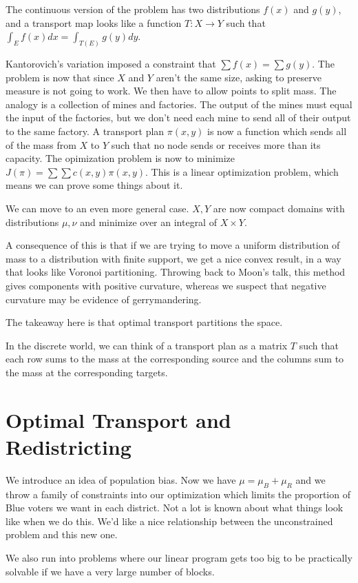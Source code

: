 The continuous version of the problem has two distributions $f(x)$ and $g(y)$, and a transport map looks like a function $T:X\rightarrow Y$ such that $\int_{E}f(x)dx  = \int_{T(E)} g(y)dy$.  

Kantorovich's variation imposed a constraint that $\sum f(x) = \sum g(y)$.  The problem is now that since $X$ and $Y$ aren't the same size, asking to preserve measure is not going to work.  We then have to allow points to split mass.  The analogy is a collection of mines and factories.  The output of the mines must equal the input of the factories, but we don't need each mine to send all of their output to the same factory.  A transport plan $\pi(x,y)$ is now a function which sends all of the mass from $X$ to $Y$ such that no node sends or receives more than its capacity.  The opimization problem is now to minimize $J(\pi) = \sum\sum c(x,y)\pi(x,y)$.  This is a linear optimization problem, which means we can prove some things about it.

We can move to an even more general case.  $X,Y$ are now compact domains with distributions $\mu,\nu$ and minimize over an integral of $X\times Y$.  


A consequence of this is that if we are trying to move a uniform distribution of mass to a distribution with finite support, we get a nice convex result, in a way that looks like Voronoi partitioning.  Throwing back to Moon's talk, this method gives components with positive curvature, whereas we suspect that negative curvature may be evidence of gerrymandering.

The takeaway here is that optimal transport partitions the space.

In the discrete world, we can think of a transport plan as a matrix $T$ such that each row sums to the mass at the corresponding source and the columns sum to the mass at the corresponding targets.

\section*{Optimal Transport and Redistricting}


We introduce an idea of population bias.  Now we have $\mu=\mu_B+\mu_R$ and we throw a family of constraints into our optimization which limits the proportion of Blue voters we want in each district.  Not a lot is known about what things look like when we do this.  We'd like a nice relationship between the unconstrained problem and this new one.

We also run into problems where our linear program gets too big to be practically solvable if we have a very large number of blocks.


